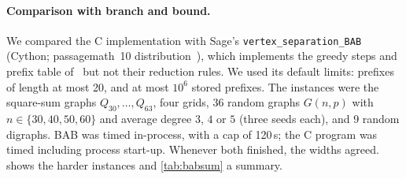 \documentclass[11pt]{article}
\theoremstyle{definition}
\begin{document}
\paragraph{Comparison with branch and bound.}
We compared the C implementation with Sage's \texttt{vertex\_separation\_BAB}
(Cython; passagemath~10 distribution~\cite{Sage}), which implements the
greedy steps and prefix table of~\cite{CMN14} but not their reduction rules.
We used its default limits: prefixes of length at most 20, and at most
$10^6$ stored prefixes. The instances were the square-sum graphs
$Q_{30},\dots,Q_{63}$, four grids, 36 random graphs $G(n,p)$ with
$n\in\{30,40,50,60\}$ and average degree $3$, $4$ or $5$ (three seeds
each), and 9 random digraphs. BAB was timed in-process, with a cap of
120\,s; the C program was timed including process start-up. Whenever both
finished, the widths agreed.  shows the harder instances and
\cref{tab:babsum} a summary.
\end{document}
